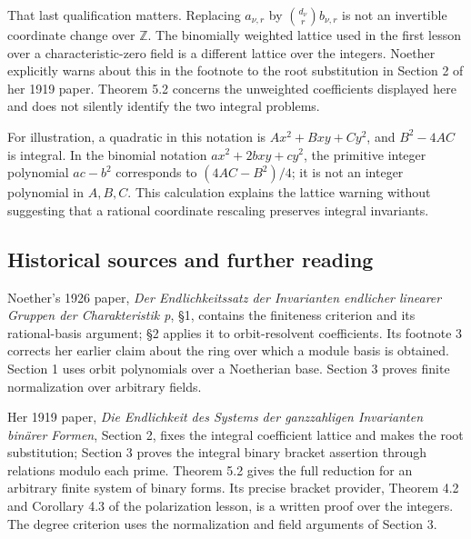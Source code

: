 \documentclass[
]{article}
\begin{document}
That last qualification matters. Replacing \(a_{\nu,r}\) by
\(\binom{d_\nu}{r}b_{\nu,r}\) is not an invertible coordinate change
over \(\mathbb Z\). The binomially weighted lattice used in the first
lesson over a characteristic-zero field is a different lattice over the
integers. Noether explicitly warns about this in the footnote to the
root substitution in Section 2 of her 1919 paper. Theorem 5.2 concerns
the unweighted coefficients displayed here and does not silently
identify the two integral problems.

For illustration, a quadratic in this notation is \(Ax^2+Bxy+Cy^2\), and
\(B^2-4AC\) is integral. In the binomial notation \(ax^2+2bxy+cy^2\),
the primitive integer polynomial \(ac-b^2\) corresponds to
\((4AC-B^2)/4\); it is not an integer polynomial in \(A,B,C\). This
calculation explains the lattice warning without suggesting that a
rational coordinate rescaling preserves integral invariants.

\subsection{Historical sources and further
reading}\label{historical-sources-and-further-reading}

Noether's 1926 paper, \emph{Der Endlichkeitssatz der Invarianten
endlicher linearer Gruppen der Charakteristik p}, §1, contains the
finiteness criterion and its rational-basis argument; §2 applies it to
orbit-resolvent coefficients. Its footnote 3 corrects her earlier claim
about the ring over which a module basis is obtained. Section 1 uses
orbit polynomials over a Noetherian base. Section 3 proves finite
normalization over arbitrary fields.

Her 1919 paper, \emph{Die Endlichkeit des Systems der ganzzahligen
Invarianten binärer Formen}, Section 2, fixes the integral coefficient
lattice and makes the root substitution; Section 3 proves the integral
binary bracket assertion through relations modulo each prime. Theorem
5.2 gives the full reduction for an arbitrary finite system of binary
forms. Its precise bracket provider, Theorem 4.2 and Corollary 4.3 of
the polarization lesson, is a written proof over the integers. The
degree criterion uses the normalization and field arguments of Section
3.
\end{document}
